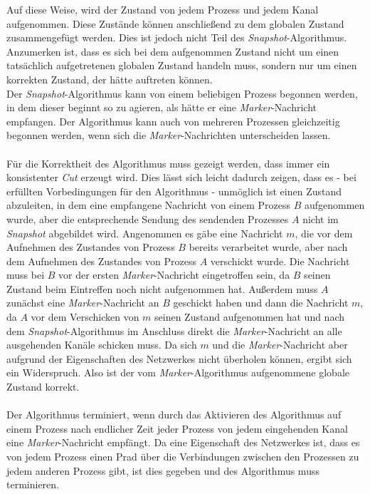 \documentclass[ngerman]{fbi-aufgabenblatt}
\begin{document}
Auf diese Weise, wird der Zustand von jedem Prozess und jedem Kanal aufgenommen. Diese Zustände können anschließend zu dem globalen Zustand zusammengefügt werden. Dies ist jedoch nicht Teil des \textit{Snapshot}-Algorithmus. Anzumerken ist, dass es sich bei dem aufgenommen Zustand nicht um einen tatsächlich aufgetretenen globalen Zustand handeln muss, sondern nur um einen korrekten Zustand, der hätte auftreten können. \\
Der \textit{Snapshot}-Algorithmus kann von einem beliebigen Prozess begonnen werden, in dem dieser beginnt so zu agieren, als hätte er eine \textit{Marker}-Nachricht empfangen. Der Algorithmus kann auch von mehreren Prozessen gleichzeitig begonnen werden, wenn sich die \textit{Marker}-Nachrichten unterscheiden lassen. \\
\\
Für die Korrektheit des Algorithmus muss gezeigt werden, dass immer ein konsistenter \textit{Cut} erzeugt wird. Dies lässt sich leicht dadurch zeigen, dass es - bei erfüllten Vorbedingungen für den Algorithmus - unmöglich ist einen Zustand abzuleiten, in dem eine empfangene Nachricht von einem Prozess $B$ aufgenommen wurde, aber die entsprechende Sendung des sendenden Prozesses $A$ nicht im \textit{Snapshot} abgebildet wird. Angenommen es gäbe eine Nachricht $m$, die vor dem Aufnehmen des Zustandes von Prozess $B$ bereits verarbeitet wurde, aber nach dem Aufnehmen des Zustandes von Prozess $A$ verschickt wurde. Die Nachricht muss bei $B$ vor der ersten \textit{Marker}-Nachricht eingetroffen sein, da $B$ seinen Zustand beim Eintreffen noch nicht aufgenommen hat. Außerdem muss $A$ zunächst eine \textit{Marker}-Nachricht an $B$ geschickt haben und dann die Nachricht $m$, da $A$ vor dem Verschicken von $m$ seinen Zustand aufgenommen hat und nach dem \textit{Snapshot}-Algorithmus im Anschluss direkt die \textit{Marker}-Nachricht an alle ausgehenden Kanäle schicken muss. Da sich $m$ und die \textit{Marker}-Nachricht aber aufgrund der Eigenschaften des Netzwerkes nicht überholen können, ergibt sich ein Widerspruch. Also ist der vom \textit{Marker}-Algorithmus aufgenommene globale Zustand korrekt. \\
\\
Der Algorithmus terminiert, wenn durch das Aktivieren des Algorithmus auf einem Prozess nach endlicher Zeit jeder Prozess von jedem eingehenden Kanal eine \textit{Marker}-Nachricht empfängt. Da eine Eigenschaft des Netzwerkes ist, dass es von jedem Prozess einen Prad über die Verbindungen zwischen den Prozessen zu jedem anderen Prozess gibt, ist dies gegeben und des Algorithmus muss terminieren.
\end{document}
